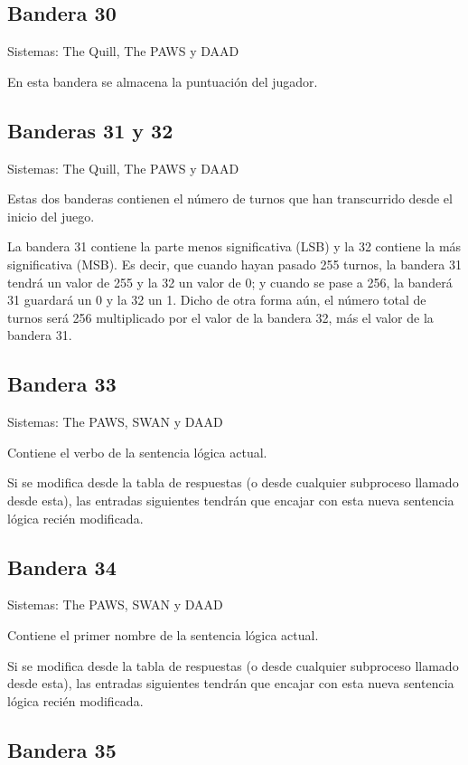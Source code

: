 \documentclass[11pt, a5paper]{article}
\newcommand{\quill}{\textsf{The Quill}\xspace}
\newcommand{\paw}{\textsf{The PAWS}\xspace}
\newcommand{\swan}{\textsf{SWAN}\xspace}
\newcommand{\daad}{\textsf{DAAD}\xspace}
\newcommand{\sistemas}[1]{\noindent Sistemas: #1 \nopagebreak}
\begin{document}
\subsection{Bandera 30}

\sistemas{\quill, \paw y \daad}

En esta bandera se almacena la puntuación del jugador.

\subsection{Banderas 31 y 32}

\sistemas{\quill, \paw y \daad}

Estas dos banderas contienen el número de turnos que han transcurrido desde el inicio del juego.

La bandera 31 contiene la parte menos significativa (LSB) y la 32 contiene la más significativa (MSB). Es decir, que cuando hayan pasado 255 turnos, la bandera 31 tendrá un valor de 255 y la 32 un valor de 0; y cuando se pase a 256, la banderá 31 guardará un 0 y la 32 un 1. Dicho de otra forma aún, el número total de turnos será 256 multiplicado por el valor de la bandera 32, más el valor de la bandera 31.

\subsection{Bandera 33}

\sistemas{\paw, \swan y \daad}

Contiene el verbo de la sentencia lógica actual.

Si se modifica desde la tabla de respuestas (o desde cualquier subproceso llamado desde esta), las entradas siguientes tendrán que encajar con esta nueva sentencia lógica recién modificada.

\subsection{Bandera 34}

\sistemas{\paw, \swan y \daad}

Contiene el primer nombre de la sentencia lógica actual.

Si se modifica desde la tabla de respuestas (o desde cualquier subproceso llamado desde esta), las entradas siguientes tendrán que encajar con esta nueva sentencia lógica recién modificada.

\subsection{Bandera 35}
\end{document}
